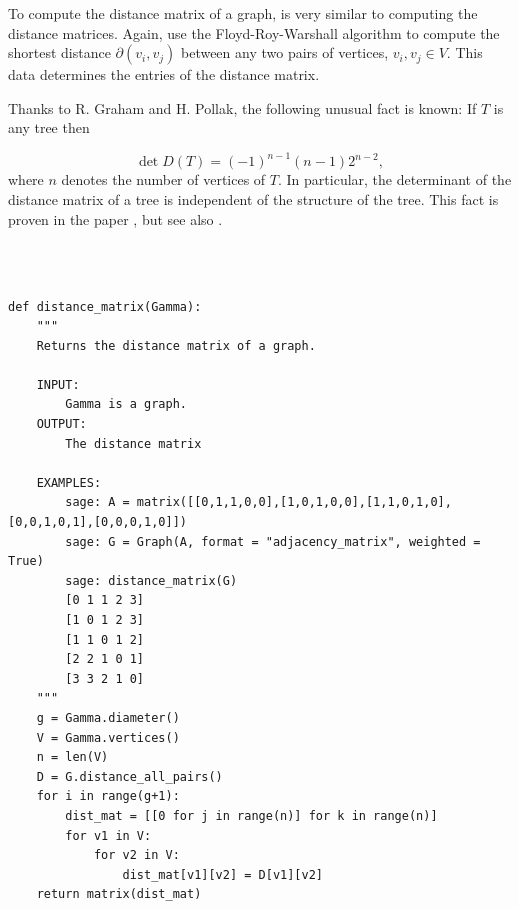 To compute the distance matrix of a graph, is very 
similar to computing the distance matrices.
Again, use the Floyd-Roy-Warshall
algorithm to compute the shortest distance 
$\partial(v_i,v_j)$ between any two pairs of vertices,
$v_i,v_j\in V$. This data determines the entries of
the distance matrix.

\begin{remark}
{\rm
Thanks to R. Graham and H. Pollak, the following unusual fact is
known:
If $T$ is any tree then 

\[
\det D(T)=(-1)^{n-1}(n-1)2^{n-2}, 
\]
where $n$ denotes the number of vertices of $T$.
In particular, the determinant of the distance matrix of a tree is
independent of the structure of the tree.  This fact is proven in the
paper \cite{GrahamPollak1971}, but see also 
\cite{EdelbergEtAl1976}.
}
\end{remark}


%
\begin{center}
\fontsize{9pt}{9pt}
\selectfont
\tt
\begin{lstlisting}

def distance_matrix(Gamma):
    """
    Returns the distance matrix of a graph.

    INPUT:
        Gamma is a graph.
    OUTPUT:
        The distance matrix

    EXAMPLES:
        sage: A = matrix([[0,1,1,0,0],[1,0,1,0,0],[1,1,0,1,0],[0,0,1,0,1],[0,0,0,1,0]])
        sage: G = Graph(A, format = "adjacency_matrix", weighted = True)
        sage: distance_matrix(G)
        [0 1 1 2 3]
        [1 0 1 2 3]
        [1 1 0 1 2]
        [2 2 1 0 1]
        [3 3 2 1 0]
    """
    g = Gamma.diameter()
    V = Gamma.vertices()
    n = len(V)
    D = G.distance_all_pairs()
    for i in range(g+1):
        dist_mat = [[0 for j in range(n)] for k in range(n)]
        for v1 in V:
            for v2 in V:
                dist_mat[v1][v2] = D[v1][v2]
    return matrix(dist_mat)

\end{lstlisting}
\end{center}
%

